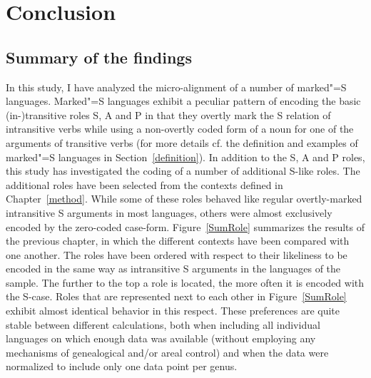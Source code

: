 \chapter{Conclusion}\label{conclusion}


\section{Summary of the findings}

In this study, I have analyzed the micro-alignment of a number of marked"=S languages.
Marked"=S languages exhibit a peculiar pattern of encoding the basic (in-)transitive roles S, A and P in that they overtly mark the S relation of intransitive verbs while using a non-overtly coded form of a noun for one of the arguments of transitive verbs (for more details cf. the definition and examples of marked"=S languages in Section~\ref{definition}). 
In addition to the S, A and P roles, this study has investigated the coding of a number of additional S-like roles.
The additional roles have been selected from the contexts defined in Chapter~\ref{method}.
While some of these roles behaved like regular overtly-marked intransitive S arguments in most languages, others were almost exclusively encoded by the zero-coded case-form. 
Figure~\ref{SumRole} summarizes  the results of the previous chapter, in which the different contexts have been compared with one another.
The roles have been ordered with respect to their likeliness to be encoded in the same way as intransitive S arguments in the languages of the sample. 
The further to the top a role is located, the more often it is encoded with the S-case.
Roles that are represented next to each other in Figure~\ref{SumRole} exhibit almost identical behavior in this respect.
These preferences are quite stable between different calculations, both when including all individual languages on which enough data was available (without employing any mechanisms of genealogical and/or areal control) and when the data were normalized to include only one data point per genus.

